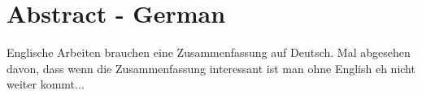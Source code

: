 \chapter*{Abstract - German} %
Englische Arbeiten brauchen eine Zusammenfassung auf Deutsch. Mal abgesehen davon, dass wenn die Zusammenfassung interessant ist man ohne English eh nicht weiter kommt...